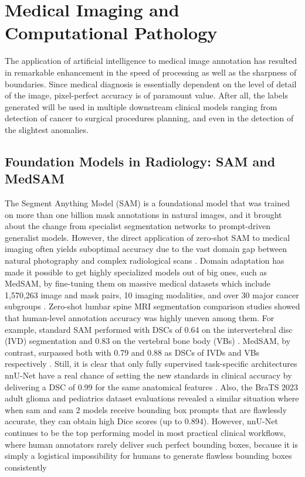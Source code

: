 \documentclass[10pt, conference, letterpaper]{IEEEtran}
\begin{document}
\section{Medical Imaging and Computational Pathology}
\label{sec:medical}
The application of artificial intelligence to medical image annotation has resulted in remarkable enhancement in the speed of processing as well as the sharpness of boundaries. Since medical diagnosis is essentially dependent on the level of detail of the image, pixel-perfect accuracy is of paramount value. After all, the labels generated will be used in multiple downstream clinical models ranging from detection of cancer to surgical procedures planning, and even in the detection of the slightest anomalies.

\subsection{Foundation Models in Radiology: SAM and MedSAM}
The Segment Anything Model (SAM) is a foundational model that was trained on more than one billion mask annotations in natural images, and it brought about the change from specialist segmentation networks to prompt-driven generalist models\cite{ref10}. However, the direct application of zero-shot SAM to medical imaging often yields suboptimal accuracy due to the vast domain gap between natural photography and complex radiological scans \cite{ref10}.
Domain adaptation has made it possible to get highly specialized models out of big ones, such as MedSAM, by fine-tuning them on massive medical datasets which include 1,570,263 image and mask pairs, 10 imaging modalities, and over 30 major cancer subgroups \cite{ref12}. Zero-shot lumbar spine MRI segmentation comparison studies showed that human-level annotation accuracy was highly uneven among them. For example, standard SAM performed with DSCs of 0.64 on the intervertebral disc (IVD) segmentation and 0.83 on the vertebral bone body (VBs) \cite{ref14}. MedSAM, by contrast, surpassed both with 0.79 and 0.88 as DSCs of IVDs and VBs respectively \cite{ref14}. Still, it is clear that only fully supervised task-specific architectures nnU-Net have a real chance of setting the new standards in clinical accuracy by delivering a DSC of 0.99 for the same anatomical features \cite{ref14}. Also, the BraTS 2023 adult glioma and pediatrics dataset evaluations revealed a similar situation where when sam and sam 2 models receive bounding box prompts that are flawlessly accurate, they can obtain high Dice scores (up to 0.894). However, nnU-Net continues to be the top performing model in most practical clinical workflows, where human annotators rarely deliver such perfect bounding boxes, because it is simply a logistical impossibility for humans to generate flawless bounding boxes consistently \cite{ref15}
\end{document}
